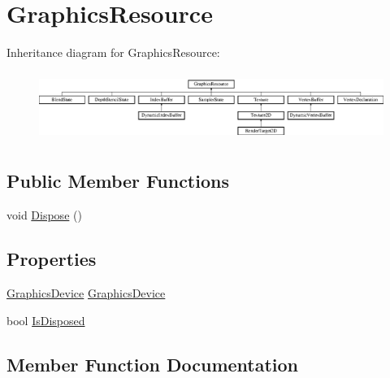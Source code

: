 \hypertarget{classMicrosoft_1_1Xna_1_1Framework_1_1Graphics_1_1GraphicsResource}{}\section{Graphics\+Resource}
\label{classMicrosoft_1_1Xna_1_1Framework_1_1Graphics_1_1GraphicsResource}
Inheritance diagram for Graphics\+Resource\+:\begin{figure}[H]
\begin{center}
\leavevmode
\includegraphics[height=2.269504cm]{classMicrosoft_1_1Xna_1_1Framework_1_1Graphics_1_1GraphicsResource}
\end{center}
\end{figure}
\subsection*{Public Member Functions}
\begin{DoxyCompactItemize}
\item 
void \hyperlink{classMicrosoft_1_1Xna_1_1Framework_1_1Graphics_1_1GraphicsResource_a6e2d745cdb7a7b983f861ed6a9a541a7}{Dispose} ()
\end{DoxyCompactItemize}
\subsection*{Properties}
\begin{DoxyCompactItemize}
\item 
\hyperlink{classMicrosoft_1_1Xna_1_1Framework_1_1Graphics_1_1GraphicsDevice}{Graphics\+Device} \hyperlink{classMicrosoft_1_1Xna_1_1Framework_1_1Graphics_1_1GraphicsResource_a0effcfeca0faa77862cd406f75026efa}{Graphics\+Device}
\item 
bool \hyperlink{classMicrosoft_1_1Xna_1_1Framework_1_1Graphics_1_1GraphicsResource_ab96a71c70205ed1aa4af692ee7f35403}{Is\+Disposed}
\end{DoxyCompactItemize}


\subsection{Member Function Documentation}
\hypertarget{classMicrosoft_1_1Xna_1_1Framework_1_1Graphics_1_1GraphicsResource_a6e2d745cdb7a7b983f861ed6a9a541a7}{}
